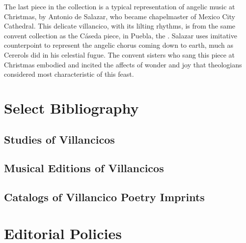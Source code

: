 The last piece in the collection is a typical representation of angelic music at Christmas, by Antonio de Salazar, who became chapelmaster of Mexico City Cathedral.
This delicate villancico, with its lilting rhythms, is from the same convent collection as the Cáseda piece, in Puebla, the .
Salazar uses imitative counterpoint to represent the angelic chorus coming down to earth, much as Cererols did in his celestial fugue. 
The convent sisters who sang this piece at Christmas embodied and incited the affects of wonder and joy that theologians considered most characteristic of this feast.

\section{Select Bibliography}

\subsection{Studies of Villancicos}
\nocite{Rubio:Forma}
\nocite{Laird:VC}
\nocite{Torrente:PhD}
\nocite{Tenorio:SorJuana}
\nocite{CaberoPueyo:PhD}
\nocite{Illari:Polychoral}
\nocite{Knighton-Torrente:VCs}
\nocite{Cashner:Cards}
\printbibliography[heading=none,filter=villancico-studies]

\subsection{Musical Editions of Villancicos}
\nocite{Cererols:MEM-VC}
\nocite{Stevenson:Christmas}
\nocite{Ruimonte:Parnaso}
\nocite{Padilla:Tello}
\nocite{Ezquerro:MME55}
\nocite{RuizSamaniego:MME63}
\nocite{Ezquerro:MME59}
\nocite{Ezquerro:MME65}
\nocite{Fernandez:Cancionero}
\nocite{Torrejon:VCs}
\printbibliography[heading=none,filter=villancico-editions]

\subsection{Catalogs of Villancico Poetry Imprints}
\nocite{BNE:VCs17C}
\nocite{BNE:VCs18C}
\nocite{UK:VCs}
\nocite{US:VCs}
\printbibliography[heading=none,filter=villancico-imprint-catalogs]

\section{Editorial Policies}

